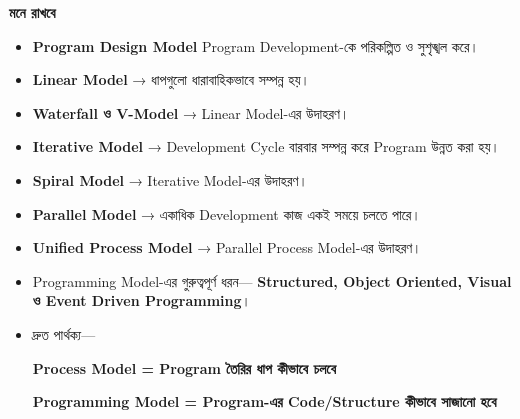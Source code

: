 \begin{rememberbox}

\textbf{\color{deepOrange}মনে রাখবে}

\begin{itemize}

\item \textbf{Program Design Model} Program Development-কে
পরিকল্পিত ও সুশৃঙ্খল করে।

\item \textbf{Linear Model} →
ধাপগুলো ধারাবাহিকভাবে সম্পন্ন হয়।

\item \textbf{Waterfall ও V-Model} →
Linear Model-এর উদাহরণ।

\item \textbf{Iterative Model} →
Development Cycle বারবার সম্পন্ন করে Program উন্নত করা হয়।

\item \textbf{Spiral Model} →
Iterative Model-এর উদাহরণ।

\item \textbf{Parallel Model} →
একাধিক Development কাজ একই সময়ে চলতে পারে।

\item \textbf{Unified Process Model} →
Parallel Process Model-এর উদাহরণ।

\item Programming Model-এর গুরুত্বপূর্ণ ধরন—
\textbf{Structured, Object Oriented, Visual ও Event Driven Programming}।

\item দ্রুত পার্থক্য—

\begin{center}

\textbf{
Process Model
=
Program তৈরির ধাপ কীভাবে চলবে
}

\vspace{0.5mm}

\textbf{
Programming Model
=
Program-এর Code/Structure কীভাবে সাজানো হবে
}

\end{center}

\end{itemize}

\end{rememberbox}

\small

